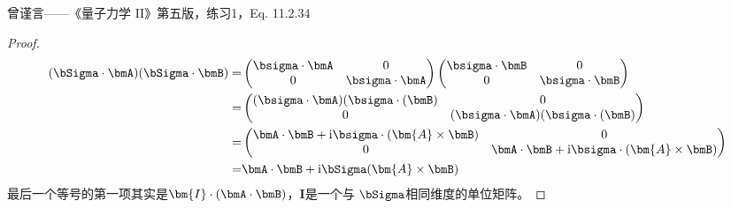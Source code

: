 曾谨言——《量子力学 II》第五版，练习1，Eq. 11.2.34
\begin{proof}
    \begin{equation}
        \begin{aligned}
            (\bSigma \cdot \bmA) (\bSigma \cdot \bmB) =&
            \begin{pmatrix}
                \bsigma \cdot \bmA  &  0 \\
                0                         &  \bsigma \cdot \bmA
            \end{pmatrix}
            \begin{pmatrix}
                \bsigma \cdot \bmB  &  0 \\
                0                         &  \bsigma \cdot \bmB
            \end{pmatrix} \\
        =& \begin{pmatrix}
            (\bsigma \cdot \bmA) (\bsigma \cdot (\bmB)  &  0 \\
            0  &  (\bsigma \cdot \bmA) (\bsigma \cdot (\bmB) \\
           \end{pmatrix} \\
        =& \begin{pmatrix}
            \bmA \cdot \bmB + {\rm i} \bsigma \cdot (\bm{A} \times \bmB)  &  0 \\
            0  &  \bmA \cdot \bmB + {\rm i} \bsigma \cdot (\bm{A} \times \bmB) \\
           \end{pmatrix} \\
        =& \bmA \cdot \bmB + {\rm i} \bSigma (\bm{A} \times \bmB)
        \end{aligned}
    \end{equation}
    最后一个等号的第一项其实是$\bm{I} \cdot (\bmA \cdot \bmB)$，$\bm{I}$是一个与
    $\bSigma$相同维度的单位矩阵。
\end{proof}

